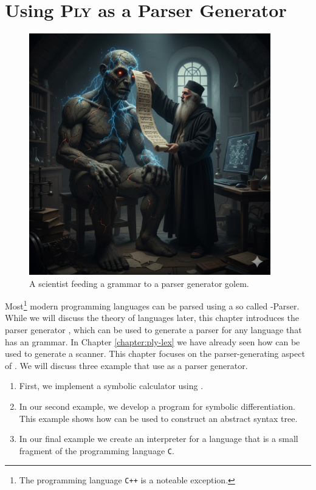 \chapter{Using \textsc{Ply} as a Parser Generator  \label{chapter:ply}}

\begin{figure}[h] 
\centering
  \includegraphics[width=10.5cm]{Abbildungen/golem.png}
\caption{A scientist feeding a grammar to a parser generator golem.}
\label{fig:golem.png}
\end{figure}


Most\footnote{The programming language \texttt{C++} is a noteable exception.} modern programming languages can
be parsed using a so called -Parser.  While we will discuss the theory of  languages
later, this chapter introduces the parser generator \href{https://www.dabeaz.com/ply/}{}, which can be used to
generate a parser for any language that has an  grammar.  In Chapter \ref{chapter:ply-lex} we have already
seen how  can be used to generate a scanner.  This chapter focuses on the parser-generating aspect
of .
We will discuss three example that use  as a parser generator.
\begin{enumerate}
\item First, we implement a symbolic calculator using .
\item In our second example, we develop a program for symbolic differentiation.
      This example shows how  can be used to construct an abstract syntax tree.
\item In our final example we create an interpreter for a language that is a small fragment of the
      programming language \texttt{C}.
\end{enumerate}


